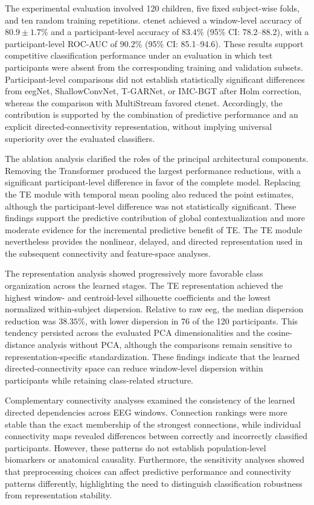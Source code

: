 The experimental evaluation involved 120 children, five fixed subject-wise folds, and ten random training repetitions. \gls{ctenet} achieved a window-level accuracy of $80.9 \pm 1.7\%$ and a participant-level accuracy of $83.4\%$ (95\% CI: 78.2--88.2), with a participant-level ROC-AUC of $90.2\%$ (95\% CI: 85.1--94.6). These results support competitive classification performance under an evaluation in which test participants were absent from the corresponding training and validation subsets. Participant-level comparisons did not establish statistically significant differences from \gls{eeg}Net, ShallowConvNet, T-GARNet, or IMC-BGT after Holm correction, whereas the comparison with MultiStream favored \gls{ctenet}. Accordingly, the contribution is supported by the combination of predictive performance and an explicit directed-connectivity representation, without implying universal superiority over the evaluated classifiers.

The ablation analysis clarified the roles of the principal architectural components. Removing the Transformer produced the largest performance reductions, with a significant participant-level difference in favor of the complete model. Replacing the TE module with temporal mean pooling also reduced the point estimates, although the participant-level difference was not statistically significant. These findings support the predictive contribution of global contextualization and more moderate evidence for the incremental predictive benefit of TE. The TE module nevertheless provides the nonlinear, delayed, and directed representation used in the subsequent connectivity and feature-space analyses.

The representation analysis showed progressively more favorable class organization across the learned stages. The TE representation achieved the highest window- and centroid-level silhouette coefficients and the lowest normalized within-subject dispersion. Relative to raw \gls{eeg}, the median dispersion reduction was $38.35\%$, with lower dispersion in 76 of the 120 participants. This tendency persisted across the evaluated PCA dimensionalities and the cosine-distance analysis without PCA, although the comparisons remain sensitive to representation-specific standardization. These findings indicate that the learned directed-connectivity space can reduce window-level dispersion within participants while retaining class-related structure.

Complementary connectivity analyses examined the consistency of the learned directed dependencies across EEG windows. Connection rankings were more stable than the exact membership of the strongest connections, while individual connectivity maps revealed differences between correctly and incorrectly classified participants. However, these patterns do not establish population-level biomarkers or anatomical causality. Furthermore, the sensitivity analyses showed that preprocessing choices can affect predictive performance and connectivity patterns differently, highlighting the need to distinguish classification robustness from representation stability.

